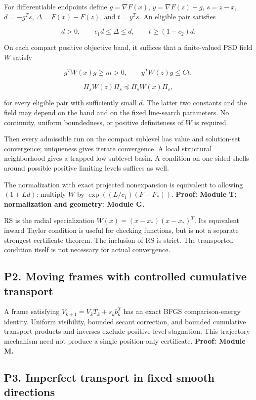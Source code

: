 For differentiable endpoints define \(g=\nabla F(x)\), \(y=\nabla F(z)-g\), \(s=z-x\), \(d=-g^Ts\), \(\Delta=F(x)-F(z)\), and \(t=y^Ts\). An eligible pair satisfies

\[d>0,\qquad c_1d\le\Delta\le d,\qquad t\ge(1-c_2)d.\]

On each compact positive objective band, it suffices that a finite-valued PSD field \(W\) satisfy

\[g^TW(x)g\ge m>0,\qquad y^TW(z)y\le Ct,\]

\[\Pi_sW(z)\Pi_s\preceq\Pi_sW(x)\Pi_s,\]

for every eligible pair with sufficiently small \(d\). The latter two constants and the field may depend on the band and on the fixed line-search parameters. No continuity, uniform boundedness, or positive definiteness of \(W\) is required.

Then every admissible run on the compact sublevel has value and solution-set convergence; uniqueness gives iterate convergence. A local structural neighborhood gives a trapped low-sublevel basin. A condition on one-sided shells around possible positive limiting levels suffices as well.

The normalization with exact projected nonexpansion is equivalent to allowing \((1+Ld)\): multiply \(W\) by \(\exp((L/c_1)(F-F_*))\). \textbf{Proof: Module T; normalization and geometry: Module G.}

RS is the radial specialization \(W(x)=(x-x_*)(x-x_*)^T\). Its equivalent inward Taylor condition is useful for checking functions, but is not a separate strongest certificate theorem. The inclusion of RS is strict. The transported condition itself is not necessary for actual convergence.

\subsection{P2. Moving frames with controlled cumulative transport}\label{p2.-moving-frames-with-controlled-cumulative-transport}

A frame satisfying \(V_{k+1}=V_kT_k+s_kb_k^T\) has an exact BFGS comparison-energy identity. Uniform visibility, bounded secant correction, and bounded cumulative transport products and inverses exclude positive-level stagnation. This trajectory mechanism need not produce a single position-only certificate. \textbf{Proof: Module M.}

\subsection{P3. Imperfect transport in fixed smooth directions}\label{p3.-imperfect-transport-in-fixed-smooth-directions}

